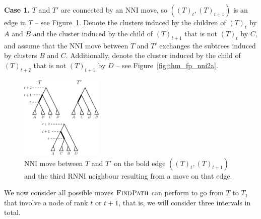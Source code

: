 \documentclass[11pt]{amsart}
\newcommand{\rnni}{\mathrm{RNNI}}
\newcommand{\findpath}{\textsc{FindPath}}
\newcommand{\nni}{\mathrm{NNI}}
\begin{document}
\textbf{Case 1.}
$T$ and $T'$ are connected by an $\nni$ move, so $((T)_t,(T)_{t+1})$ is an edge in $T$ -- see Figure~\ref{fig:thm_fp_nni1}.
Denote the clusters induced by the children of $(T)_t$ by $A$ and $B$ and the cluster induced by the child of $(T)_{t+1}$ that is not $(T)_t$ by $C$, and assume that the $\nni$ move between $T$ and $T'$ exchanges the subtrees induced by clusters $B$ and $C$.
Additionally, denote the cluster induced by the child of $(T)_{t+2}$ that is not $(T)_{t+1}$ by $D$ -- see Figure~\ref{fig:thm_fp_nni2a}.

\begin{figure}[!hbt]
\centering
\includegraphics[width=0.35\textwidth]{thm_fp_nni1}
\caption{$\nni$ move between $T$ and $T'$ on the bold edge $((T)_t,(T)_{t+1})$ and the third $\rnni$ neighbour resulting from a move on that edge.}
\label{fig:thm_fp_nni1}
\end{figure}

We now consider all possible moves $\findpath$ can perform to go from $T$ to $T_1$ that involve a node of rank $t$ or $t+1$, that is, we will consider three intervals in total.
\end{document}
